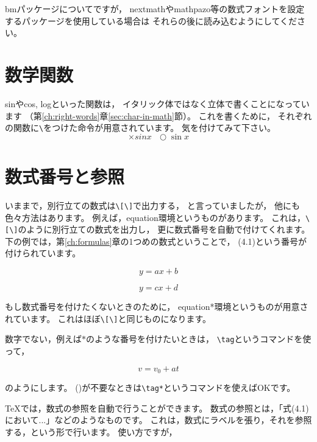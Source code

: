 \documentclass[class=jreport, crop=false, preview=false, dvipdfmx, fleqn]{standalone}
\begin{document}
bmパッケージについてですが，
nextmathやmathpazo等の数式フォントを設定するパッケージを使用している場合は
それらの後に読み込むようにしてください。



\section{数学関数}
sinやcos, logといった関数は，
イタリック体ではなく立体で書くことになっています
（第\ref{ch:right-words}章\ref{sec:char-in-math}節）。
これを書くために，
それぞれの関数に\verb|\|をつけた命令が用意されています。
気を付けてみて下さい。
\[ \times sin x \ \ \ \bigcirc \sin x \]



\section{数式番号と参照}
いままで，別行立ての数式は\verb|\[\]|で出力する，
と言っていましたが，
他にも色々方法はあります。
例えば，equation環境というものがあります。
これは，\verb|\[\]|のように別行立ての数式を出力し，
更に数式番号を自動で付けてくれます。
下の例では，第\ref{ch:formulas}章の1つめの数式ということで，
(4.1)という番号が付けられています。

\begin{IOTeX}
\begin{equation}
y = ax + b
\end{equation}

\begin{equation*}
y = cx + d
\end{equation*}
\end{IOTeX}

もし数式番号を付けたくないときのために，
equation*環境というものが用意されています。
これはほぼ\verb|\[\]|と同じものになります。

数字でない，例えば$*$のような番号を付けたいときは，
\verb|\tag|というコマンドを使って，
\begin{IOTeX}
\begin{equation*}
v = v_0 + at \tag{$*$}
\end{equation*}
\end{IOTeX}
のようにします。
()が不要なときは\verb|\tag*|というコマンドを使えばOKです。


{\TeX}では，数式の参照を自動で行うことができます。
数式の参照とは，「式(4.1)において...」などのようなものです。
これは，数式にラベルを張り，それを参照する，という形で行います。
使い方ですが，
\end{document}
